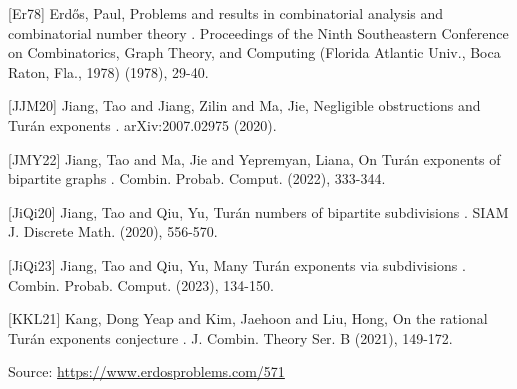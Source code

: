 \documentclass{article}
\begin{document}
[Er78] Erd\H{o}s, Paul, Problems and results in combinatorial analysis and combinatorial number theory . Proceedings of the Ninth Southeastern Conference on Combinatorics, Graph Theory, and Computing (Florida Atlantic Univ., Boca Raton, Fla., 1978) (1978), 29-40.

[JJM20] Jiang, Tao and Jiang, Zilin and Ma, Jie, Negligible obstructions and Tur\'{a}n exponents . arXiv:2007.02975 (2020).

[JMY22] Jiang, Tao and Ma, Jie and Yepremyan, Liana, On Tur\'{a}n exponents of bipartite graphs . Combin. Probab. Comput. (2022), 333-344.

[JiQi20] Jiang, Tao and Qiu, Yu, Tur\'{a}n numbers of bipartite subdivisions . SIAM J. Discrete Math. (2020), 556-570.

[JiQi23] Jiang, Tao and Qiu, Yu, Many Tur\'{a}n exponents via subdivisions . Combin. Probab. Comput. (2023), 134-150.

[KKL21] Kang, Dong Yeap and Kim, Jaehoon and Liu, Hong, On the rational Tur\'{a}n exponents conjecture . J. Combin. Theory Ser. B (2021), 149-172.


\bigskip
\noindent\small{Source: \url{https://www.erdosproblems.com/571}}
\end{document}
